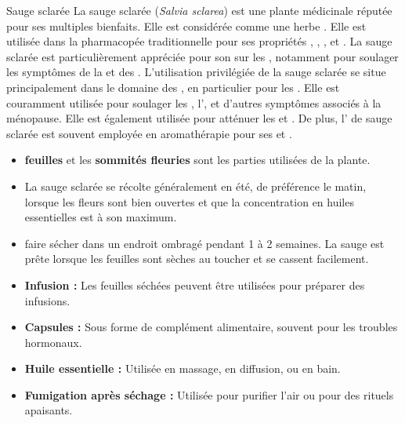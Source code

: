 \ficheidentiteplante
{Sauge sclarée}
{%
    La sauge sclarée (\textit{Salvia sclarea}) est une plante médicinale réputée pour ses multiples bienfaits. Elle est considérée comme une herbe . Elle est utilisée dans la pharmacopée traditionnelle pour ses propriétés , , , et . La sauge sclarée est particulièrement appréciée pour son  sur les , notamment pour soulager les symptômes de la  et des .
}
{%
    L'utilisation privilégiée de la sauge sclarée se situe principalement dans le domaine des , en particulier pour les . Elle est couramment utilisée pour soulager les , l', et d'autres symptômes associés à la ménopause. Elle est également utilisée pour atténuer les  et . De plus, l' de sauge sclarée est souvent employée en aromathérapie pour ses  et .
}
{%
    \begin{itemize}[label = \bcplume]
        \item \textbf{feuilles} et les \textbf{sommités fleuries} sont les parties utilisées de la plante.
        \item La sauge sclarée se récolte généralement en été, de préférence le matin, lorsque les fleurs sont bien ouvertes et que la concentration en huiles essentielles est à son maximum. 
        \item faire sécher dans un endroit ombragé pendant 1 à 2 semaines. La sauge est prête lorsque les feuilles sont sèches au toucher et se cassent facilement.
    \end{itemize}
    }

{%
    \begin{itemize}
        \item \textbf{Infusion :} Les feuilles séchées peuvent être utilisées pour préparer des infusions.
        \item \textbf{Capsules :} Sous forme de complément alimentaire, souvent pour les troubles hormonaux.
        \item \textbf{Huile essentielle :} Utilisée en massage, en diffusion, ou en bain.
        \item \textbf{Fumigation après séchage :} Utilisée pour purifier l'air ou pour des rituels apaisants.
    \end{itemize}
}

